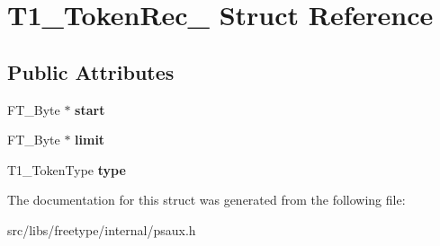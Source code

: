 \hypertarget{struct_t1___token_rec__}{
\section{T1\_\-TokenRec\_\- Struct Reference}
\label{struct_t1___token_rec__}
}
\subsection*{Public Attributes}
\begin{DoxyCompactItemize}
\item 
\hypertarget{struct_t1___token_rec___a1b365e2910220eabf05f925f45bc98d6}{
FT\_\-Byte $\ast$ {\bfseries start}}
\label{struct_t1___token_rec___a1b365e2910220eabf05f925f45bc98d6}

\item 
\hypertarget{struct_t1___token_rec___aacd035f0dfbc47b7e1c7eefbe2c2080c}{
FT\_\-Byte $\ast$ {\bfseries limit}}
\label{struct_t1___token_rec___aacd035f0dfbc47b7e1c7eefbe2c2080c}

\item 
\hypertarget{struct_t1___token_rec___a88b3b889e74609be1827ead4093a2d52}{
T1\_\-TokenType {\bfseries type}}
\label{struct_t1___token_rec___a88b3b889e74609be1827ead4093a2d52}

\end{DoxyCompactItemize}


The documentation for this struct was generated from the following file:\begin{DoxyCompactItemize}
\item 
src/libs/freetype/internal/psaux.h\end{DoxyCompactItemize}
